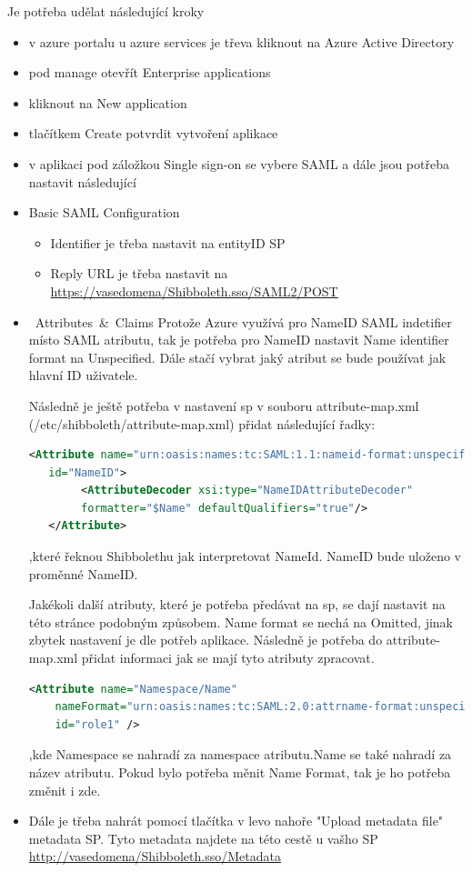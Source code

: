 Je potřeba udělat následující kroky
\begin{itemize}
    \item v azure portalu u azure services je třeva kliknout na Azure Active Directory
    \item pod manage otevřít Enterprise applications
    \item kliknout na New application
    \item tlačítkem Create potvrdit vytvoření aplikace
    \item v aplikaci pod záložkou Single sign-on se vybere SAML a dále jsou potřeba nastavit následující
    \item Basic SAML Configuration
    \begin{itemize}
        \item Identifier je třeba nastavit na entityID SP
        \item Reply URL je třeba nastavit na \url{https://vasedomena/Shibboleth.sso/SAML2/POST}
    \end{itemize}
    \item \mbox{ Attributes \& Claims} \linebreak
    Protože Azure využívá pro NameID SAML indetifier místo SAML atributu, tak je potřeba pro NameID nastavit Name identifier format na Unspecified.
    Dále stačí vybrat jaký atribut se bude používat jak hlavní ID uživatele.
    
    Následně je ještě potřeba v nastavení sp v souboru attribute-map.xml (/etc/shibboleth/attribute-map.xml) přidat následující řadky:
    
    \begin{lstlisting}[language=XML]
   <Attribute name="urn:oasis:names:tc:SAML:1.1:nameid-format:unspecified"
   id="NameID">
        <AttributeDecoder xsi:type="NameIDAttributeDecoder" 
        formatter="$Name" defaultQualifiers="true"/>
   </Attribute>
\end{lstlisting}
,které řeknou Shibbolethu jak interpretovat NameId. NameID bude uloženo v proměnné NameID.

Jakékoli další atributy, které je potřeba předávat na sp, se dají nastavit na této stránce podobným způsobem. Name format se nechá na Omitted, jinak zbytek nastavení je dle potřeb aplikace. Následně je potřeba do attribute-map.xml přidat informaci jak se mají tyto atributy zpracovat.
   \begin{lstlisting}[language=XML]
     <Attribute name="Namespace/Name"
    nameFormat="urn:oasis:names:tc:SAML:2.0:attrname-format:unspecified"
    id="role1" />
    \end{lstlisting}
,kde Namespace se nahradí za namespace atributu.Name se také nahradí za název atributu. Pokud bylo potřeba měnit Name Format, tak je ho potřeba změnit i zde.
    


    \item Dále je třeba nahrát pomocí tlačítka v levo nahoře "Upload metadata file" metadata SP. Tyto metadata najdete na této cestě u vašho SP \url{http://vasedomena/Shibboleth.sso/Metadata}

\end{itemize}

